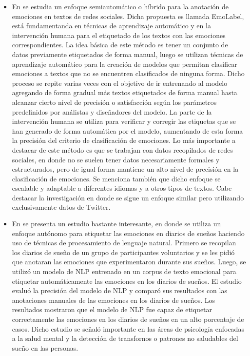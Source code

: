 \documentclass[12pt, conference]{IEEEtran}
\begin{document}
\begin{itemize}
 \item En \cite{f4} se estudia un enfoque semiautomático o híbrido para la anotación de emociones en textos de redes sociales. Dicha propuesta es llamada EmoLabel, está fundamentanda en técnicas de aprendizaje automático y en la intervención humana para el etiquetado de los textos con las emociones correspondientes. La idea básica de este método es tener un conjunto de datos previamente etiquetados de forma manual, luego se utilizan técnicas de aprendizaje automático para la creación de modelos que permitan clasificar emociones a textos que no se encuentren clasificados de ninguna forma. Dicho proceso se repite varias veces con el objetivo de ir entrenando al modelo agregando de forma gradual más textos etiquetados de forma manual hasta alcanzar cierto nivel de precisión o satisfacción según los parámetros predefinidos por análistas y diseñadores del modelo. La parte de la intervención humana se utiliza para verificar y corregir las etiquetas que se han generado de forma automática por el modelo, aumentando de esta forma la precisión del criterio de clasificación de emociones. Lo más importante a destacar de este método es que se trabajan con datos recopilados de redes sociales, en donde no se suelen tener datos necesariamente formales y estructurados, pero de igual forma mantiene un alto nivel de precisión en la clasificación de emociones. Se menciona también que dicho enfoque se escalable y adaptable a diferentes idiomas y a otros tipos de textos. Cabe destacar la investigación \cite{f5} en donde se sigue un enfoque similar pero utilizando exclusivamente datos de Twitter.
 \item En \cite{f6} se presenta un estudio bastante interesante, en donde se utiliza un enfoque autónomo para etiquetar las emociones en diarios de sueños haciendo uso de técnicas de procesamiento de lenguaje natural. Primero se recopilan los diarios de sueño de un grupo de participantes voluntarios y se les pidió que anotaran las emociones que experimentaron durante sus sueños. Luego, se utilizó un modelo de NLP entrenado en un corpus de texto emocional para etiquetar automáticamente las emociones en los diarios de sueños. El estudio evaluó la precisión del modelo de NLP y comparó sus resultados con las anotaciones manuales de las emociones en los diarios de sueños. Los resultados mostraron que el modelo de NLP fue capaz de etiquetar correctamente las emociones en los diarios de sueños en un alto porcentaje de casos. Dicho estudio se señaló importante en las áreas de psicología enfocadas a la salud mental y la detección de transfornos o patrones no saludables del sueño en las personas.

\end{itemize}
\end{document}
